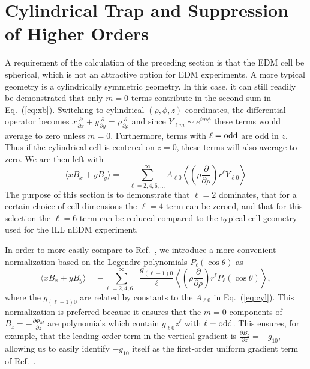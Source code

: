 \documentclass[preprint,12pt]{elsarticle}
\begin{document}
\section{Cylindrical Trap and Suppression of Higher Orders}
\label{sec:cylinder}

A requirement of the calculation of the preceding section is that the
EDM cell be spherical, which is not an attractive option for EDM
experiments.  A more typical geometry is a cylindrically symmetric
geometry.  In this case, it can still readily be demonstrated that
only $m=0$ terms contribute in the second sum in Eq.~(\ref{eq:xb}).
Switching to cylindrical $(\rho,\phi,z)$ coordinates, the differential
operator becomes $x\frac{\partial}{\partial
  x}+y\frac{\partial}{\partial y}=\rho\frac{\partial}{\partial\rho}$
and since $Y_{\ell m}\sim e^{im\phi}$ these terms would average to
zero unless $m=0$.  Furthermore, terms with $\ell={\rm odd}$ are odd
in $z$.  Thus if the cylindrical cell is centered on $z=0$, these
terms will also average to zero.  We are then left with
\begin{equation}
  \label{eq:cyl}
  \langle xB_x+yB_y\rangle=-\sum_{\ell=2,4,6,...}^\infty A_{\ell
    0}\left\langle\left(\rho\frac{\partial}{\partial
    \rho}\right)r^\ell Y_{\ell
    0}\right\rangle
\end{equation}
The purpose of this section is to demonstrate that $\ell=2$ dominates,
that for a certain choice of cell dimensions the $\ell=4$ term can be
zeroed, and that for this selection the $\ell=6$ term can be reduced
compared to the typical cell geometry used for the ILL nEDM
experiment.

In order to more easily compare to Ref.~\cite{bib:pignol-roccia}, we
introduce a more convenient normalization based on the Legendre
polynomials $P_\ell(\cos\theta)$ as
\begin{equation}
    \langle xB_x+yB_y\rangle= -
    \sum_{\ell=2,4,6...}^{\infty}\frac{g_{(\ell-1)0}}{\ell}\left\langle\left(\rho\frac{\partial}{\partial
      \rho}\right)r^\ell P_\ell(\cos\theta)\right\rangle,
\end{equation}
where the $g_{(\ell-1)0}$ are related by constants to the $A_{\ell 0}$
in Eq.~(\ref{eq:cyl}).  This normalization is preferred because it
ensures that the $m=0$ components of
$B_{z}=-\frac{\partial\Phi_M}{\partial z}$ are polynomials which
contain $g_{\ell 0}z^\ell$ with $\ell={\rm odd}$.  This ensures, for
example, that the leading-order term in the vertical gradient is
$\frac{\partial B_z}{\partial z}=-g_{10}$, allowing us to easily
identify $-g_{10}$ itself as the first-order uniform gradient term of
Ref.~\cite{bib:pignol-roccia}.
\end{document}
